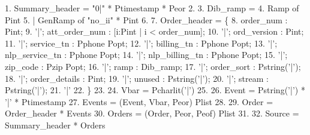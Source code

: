 \begin{code}\scriptsize
 1.  Summary\_header = "0|" * Ptimestamp * Peor
 2. \mbox{}
 3.  Dib\_ramp = 
 4.   Ramp of Pint 
 5. | GenRamp of "no\_ii" * Pint
 6. \mbox{}
 7.  Order\_header = \{ 
 8.      order\_num : Pint;  
 9. '|'; att\_order\_num : [i:Pint | i < order\_num];  
10. '|'; ord\_version : Pint;  
11. '|'; service\_tn : Pphone Popt;
12. '|'; billing\_tn : Pphone Popt;  
13. '|'; nlp\_service\_tn : Pphone Popt;  
14. '|'; nlp\_billing\_tn : Pphone Popt;  
15. '|'; zip\_code : Pzip Popt;  
16. '|'; ramp : Dib\_ramp;  
17. '|'; order\_sort : Pstring('|');  
18. '|'; order\_details : Pint;
19. '|'; unused : Pstring('|');  
20. '|'; stream : Pstring('|'); 
21. '|'
22. \} 
23. \mbox{}
24.  Vbar = Pcharlit('|')
25. \mbox{}
26.  Event  = Pstring('|') * '|' * Ptimestamp
27.  Events = (Event, Vbar, Peor) Plist
28. \mbox{}
29.  Order  = Order\_header * Events
30.  Orders = (Order, Peor, Peof) Plist
31. \mbox{}
32.  Source = Summary\_header * Orders
\end{code}
